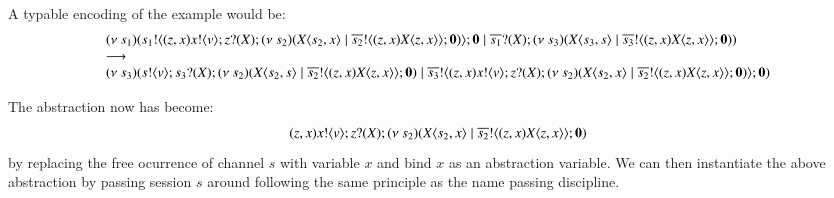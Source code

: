 A typable encoding of the example would be:
\[
	\begin{array}{l}
		(\nu\ s_1)(s_1 ! \langle (z,x) x ! \langle v \rangle ; z ? (X) ; (\nu\ s_2)(X\langle s_2,x \rangle \;|\; \overline{s_2} ! \langle (z,x) X\langle z,x \rangle  \rangle ; \mathbf{0})  \rangle ; \mathbf{0} \;|\; \overline{s_1} ? (X) ; (\nu\ s_3)(X\langle s_3,s \rangle \;|\; \overline{s_3} ! \langle (z,x) X\langle z,x \rangle \rangle ; \mathbf{0} ) )
		\\
		\longrightarrow
		\\
		(\nu\ s_3)(s ! \langle v \rangle ; s_3 ? (X) ; (\nu\ s_2)(X\langle s_2, s \rangle \;|\; \overline{s_2} ! \langle (z, x) X\langle z, x \rangle \rangle ; \mathbf{0}) \;|\; \overline{s_3} ! \langle (z, x) x ! \langle v \rangle ; z ? (X) ; (\nu\ s_2)(X\langle s_2, x \rangle \;|\; \overline{s_2} ! \langle (z, x) X\langle z, x \rangle  \rangle ; \mathbf{0})   \rangle ; \mathbf{0} )
	\end{array}
\]

The abstraction now has become:
$$(z,x) x ! \langle v \rangle ; z ? (X) ; (\nu\ s_2)(X\langle s_2,x \rangle \;|\; \overline{s_2} ! \langle (z,x) X\langle z,x \rangle  \rangle ; \mathbf{0})$$
by replacing the free ocurrence of channel $s$ with variable $x$ and
bind $x$ as an abstraction variable. We can then instantiate
the above abstraction by passing session $s$ around following the same
principle as the name passing discipline.

